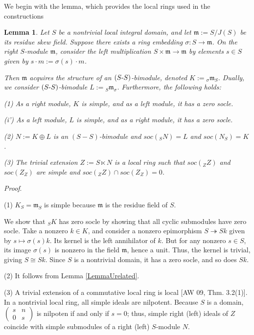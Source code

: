 \documentclass[11pt]{article}
\theoremstyle{plain}
\newtheorem{Lemma}[veta]{Lemma}
\theoremstyle{remark}
\theoremstyle{plain}
\newenvironment{Proof}{
  \par\medskip\noindent
  \textit{Proof}.
}{
\newline
\rightline{$\qedsymbol$}
}
\newcommand{\m}{\mathfrak{m}}
\begin{document}
We begin with the lemma, which provides the local rings used in the constructions
\begin{Lemma}\label{LemmaZ}
    Let $S$ be a nontrivial local integral domain, and let $\m:=S/J(S)$ be its residue skew field. Suppose there exists a ring embedding $\sigma: S\to \m$. On the right $S$-module $\m$, consider the left multiplication $S\times \m\to \m$ by elements $s\in S$ given by $s\cdot m:=\sigma(s)\cdot m$. 
    
    Then $\m$ acquires the structure of an $(S\text-S)$-bimodule, denoted $K:= {_\sigma}\m_S$. Dually,  we consider $(S\text-S)$-bimodule $L:={_S}\m_\sigma$. Furthermore, the following holds:

    (1) As a right module, $K$ is simple, and as a left module, it has a zero socle. 

    (i') As a left module, $L$ is simple, and as a right module, it has a zero socle. 

(2) $N:=K\oplus L$ is an $(S-S)$-bimodule and $soc(_SN)=L$ and $soc(N_S)=K$.

(3) The trivial extension $Z:=S\ltimes N$ is a local ring such that 
$soc({_ZZ})$ and $soc(Z_Z)$ are simple and $soc({}_ZZ)\cap soc(Z_Z)=0$.
\end{Lemma}
\begin{Proof}
    (1) $K_S=\m_S$ is simple because $\m$ is the residue field of $S$. 

   We show that $_SK$ has zero socle by showing that all cyclic submodules have zero socle. Take a nonzero $k\in K$, and consider a nonzero epimorphism $S\twoheadrightarrow Sk$ given by $s\mapsto \sigma(s)k$. Its kernel is the left annihilator of $k$. But for any nonzero $s\in S$, its image $\sigma(s)$  is nonzero in the field $\m$, hence a unit.  Thus, the kernel is trivial, giving $S\cong Sk$. Since $S$ is a nontrivial domain, it has a zero socle, and so does $Sk$.

    (2) It follows from Lemma \ref{LemmaUrelated}.

    (3) A trivial extension of a commutative local ring is local [AW 09, Thm. 3.2(1)]. In a nontrivial local ring, all simple ideals are nilpotent. Because $S$ is a domain, $\left(\begin{smallmatrix}s&n\\0&s\end{smallmatrix}\right)$ is nilpoten  if and only if $s=0$; thus, simple right (left) ideals of $Z$ coincide with simple submodules of a right (left) $S$-module $N$.
\end{Proof}
\end{document}
